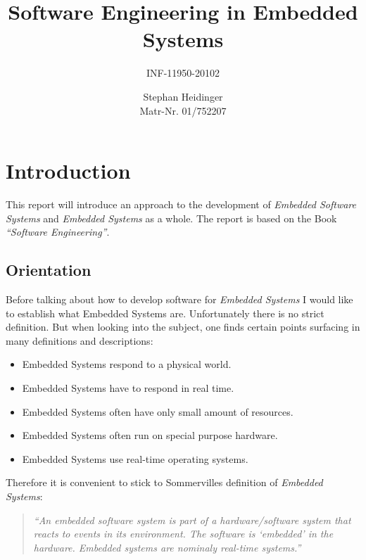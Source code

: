\documentclass[10pt,a4paper,titlepage,draft]{scrartcl} %
\author{Stephan Heidinger \\ Matr-Nr. 01/752207}
\title{Software Engineering in Embedded Systems}
\subtitle{INF-11950-20102}
\begin{document}
\maketitle

\pagestyle{empty}
\tableofcontents
\newpage
\pagestyle{plain}
\setcounter{page}{1} %


\section{Introduction}

This report will introduce an approach to the development of \emph{Embedded Software Systems} and \emph{Embedded Systems} as a whole. The report is based on the Book \textit{``Software Engineering''}\cite[chapter 20]{sommerville}.

\subsection{Orientation}
Before talking about how to develop software for \emph{Embedded Systems} I would like to establish what Embedded Systems are.
Unfortunately there is no strict definition.
But when looking into the subject, one finds certain points surfacing in many definitions and descriptions:
\begin{itemize}
	\item Embedded Systems respond to a physical world.
	\item Embedded Systems have to respond in real time.
	\item Embedded Systems often have only small amount of resources.
	\item Embedded Systems often run on special purpose hardware.
	\item Embedded Systems use real-time operating systems.
\end{itemize}
Therefore it is convenient to stick to Sommervilles definition of \emph{Embedded Systems}:
\begin{quote}
\textit{``An \emph{embedded software system} is part of a hardware/software system that reacts to events in its environment.
The software is ‘embedded’ in the hardware.
Embedded systems are nominaly real-time systems.'' \cite[p. 561]{sommerville} }
\end{quote}
\end{document}
